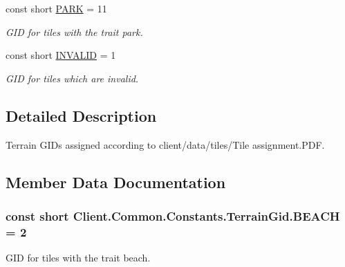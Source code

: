 \begin{DoxyCompactItemize}
const short \hyperlink{classClient_1_1Common_1_1Constants_1_1TerrainGid_a2565637fcd2b7744a10ae773d22b39a0}{P\+A\+R\+K} = 11
\begin{DoxyCompactList}\small\item\em G\+I\+D for tiles with the trait park. \end{DoxyCompactList}\item 
const short \hyperlink{classClient_1_1Common_1_1Constants_1_1TerrainGid_a99342a9ec76d98f053e86d5c9df77f97}{I\+N\+V\+A\+L\+I\+D} = 1
\begin{DoxyCompactList}\small\item\em G\+I\+D for tiles which are invalid. \end{DoxyCompactList}\end{DoxyCompactItemize}


\subsection{Detailed Description}
Terrain G\+I\+Ds assigned according to \textquotesingle{}client/data/tiles/\+Tile assignment.\+P\+D\+F\textquotesingle{}. 



\subsection{Member Data Documentation}
\hypertarget{classClient_1_1Common_1_1Constants_1_1TerrainGid_a7a9aee65c884b6eaaec5cde20d35e263}{}
\subsubsection[{B\+E\+A\+C\+H}]{\setlength{\rightskip}{0pt plus 5cm}const short Client.\+Common.\+Constants.\+Terrain\+Gid.\+B\+E\+A\+C\+H = 2}\label{classClient_1_1Common_1_1Constants_1_1TerrainGid_a7a9aee65c884b6eaaec5cde20d35e263}


G\+I\+D for tiles with the trait beach. 

\hypertarget{classClient_1_1Common_1_1Constants_1_1TerrainGid_a7a7944292196dc6c9e228f56307a36a2}{}
